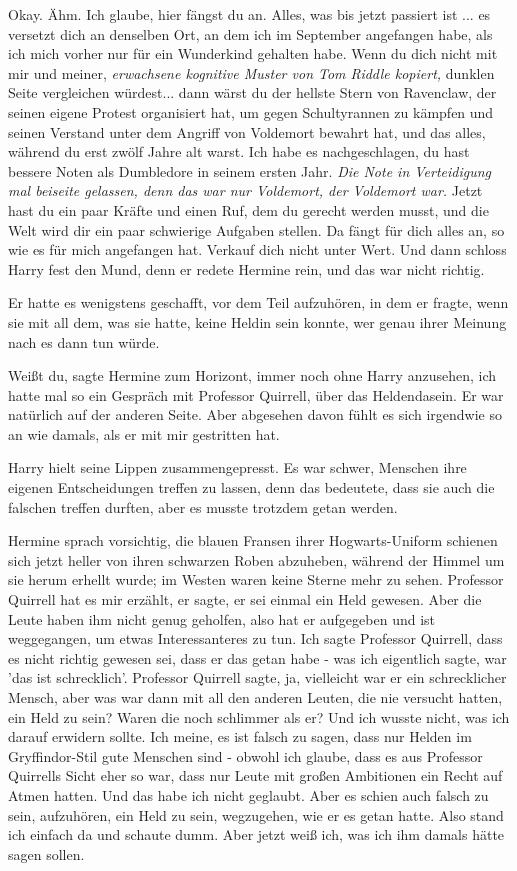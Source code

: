 \glqq{}Okay. Ähm. Ich glaube, hier fängst du an. Alles, was bis jetzt passiert
ist ... es versetzt dich an denselben Ort, an dem ich im September angefangen
habe, als ich mich vorher nur für ein Wunderkind gehalten habe. Wenn du dich
nicht mit mir und meiner\grqq{},\emph{ erwachsene kognitive Muster von Tom
Riddle kopiert,} \glqq{}dunklen Seite vergleichen würdest... dann wärst du der
hellste Stern von Ravenclaw, der seinen eigene Protest organisiert hat, um gegen
Schultyrannen zu kämpfen und seinen Verstand unter dem Angriff von Voldemort
bewahrt hat, und das alles, während du erst zwölf Jahre alt warst. Ich habe es
nachgeschlagen, du hast bessere Noten als Dumbledore in seinem ersten
Jahr.\grqq{} \emph{Die Note in Verteidigung mal beiseite gelassen, denn das war
nur Voldemort, der Voldemort war.} \glqq{}Jetzt hast du ein paar Kräfte und einen
Ruf, dem du gerecht werden musst, und die Welt wird dir ein paar schwierige
Aufgaben stellen. Da fängt für dich alles an, so wie es für mich angefangen hat.
Verkauf dich nicht unter Wert.\grqq{} Und dann schloss Harry fest den Mund, denn
er redete Hermine rein, und das war nicht richtig.

Er hatte es wenigstens geschafft, vor dem Teil aufzuhören, in dem er fragte,
wenn sie mit all dem, was sie hatte, keine Heldin sein konnte, wer genau ihrer
Meinung nach es dann tun würde.

\glqq{}Weißt du\grqq{}, sagte Hermine zum Horizont, immer noch ohne Harry
anzusehen, \glqq{}ich hatte mal so ein Gespräch mit Professor Quirrell, über das
Heldendasein. Er war natürlich auf der anderen Seite. Aber abgesehen davon fühlt
es sich irgendwie so an wie damals, als er mit mir gestritten hat.\grqq{}

Harry hielt seine Lippen zusammengepresst. Es war schwer, Menschen ihre eigenen
Entscheidungen treffen zu lassen, denn das bedeutete, dass sie auch die falschen
treffen durften, aber es musste trotzdem getan werden.

Hermine sprach vorsichtig, die blauen Fransen ihrer Hogwarts-Uniform schienen
sich jetzt heller von ihren schwarzen Roben abzuheben, während der Himmel um sie
herum erhellt wurde; im Westen waren keine Sterne mehr zu sehen. \glqq{}Professor
Quirrell hat es mir erzählt, er sagte, er sei einmal ein Held gewesen. Aber die
Leute haben ihm nicht genug geholfen, also hat er aufgegeben und ist
weggegangen, um etwas Interessanteres zu tun. Ich sagte Professor Quirrell, dass
es nicht richtig gewesen sei, dass er das getan habe - was ich eigentlich sagte,
war 'das ist schrecklich'. Professor Quirrell sagte, ja, vielleicht war er ein
schrecklicher Mensch, aber was war dann mit all den anderen Leuten, die nie
versucht hatten, ein Held zu sein? Waren die noch schlimmer als er? Und ich
wusste nicht, was ich darauf erwidern sollte. Ich meine, es ist falsch zu sagen,
dass nur Helden im Gryffindor-Stil gute Menschen sind - obwohl ich glaube, dass
es aus Professor Quirrells Sicht eher so war, dass nur Leute mit großen
Ambitionen ein Recht auf Atmen hatten. Und das habe ich nicht geglaubt. Aber es
schien auch falsch zu sein, aufzuhören, ein Held zu sein, wegzugehen, wie er es
getan hatte. Also stand ich einfach da und schaute dumm. Aber jetzt weiß ich,
was ich ihm damals hätte sagen sollen.\grqq{}

